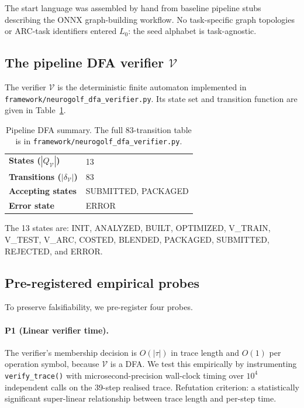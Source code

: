 The start language was assembled by hand from baseline pipeline
stubs describing the ONNX graph-building workflow.  No
task-specific graph topologies or ARC-task identifiers entered
$L_0$: the seed alphabet is task-agnostic.

\subsection{The pipeline DFA verifier $\mathcal{V}$}

The verifier $\mathcal{V}$ is the deterministic finite automaton
implemented in \texttt{framework/neurogolf\_dfa\_verifier.py}.
Its state set and transition function are given in Table~\ref{tab:dfa}.

\begin{table}[ht]
\centering
\caption{Pipeline DFA summary. The full $83$-transition table is
in \texttt{framework/neurogolf\_dfa\_verifier.py}.}
\label{tab:dfa}
\begin{tabular}{l|l}
\hline
\textbf{States ($|Q_\mathcal{V}|$)} & 13 \\
\textbf{Transitions ($|\delta_\mathcal{V}|$)} & 83 \\
\textbf{Accepting states} & \textsf{SUBMITTED}, \textsf{PACKAGED} \\
\textbf{Error state} & \textsf{ERROR} \\
\hline
\end{tabular}
\end{table}

The 13 states are:
\textsf{INIT}, \textsf{ANALYZED}, \textsf{BUILT}, \textsf{OPTIMIZED},
\textsf{V\_TRAIN}, \textsf{V\_TEST}, \textsf{V\_ARC}, \textsf{COSTED},
\textsf{BLENDED}, \textsf{PACKAGED}, \textsf{SUBMITTED},
\textsf{REJECTED}, and \textsf{ERROR}.

\subsection{Pre-registered empirical probes}

To preserve falsifiability, we pre-register four probes.

\paragraph{P1 (Linear verifier time).}
The verifier's membership decision is $O(|\tau|)$ in trace length
and $O(1)$ per operation symbol, because $\mathcal{V}$ is a DFA.
We test this empirically by instrumenting
\texttt{verify\_trace()} with microsecond-precision wall-clock
timing over $10^4$ independent calls on the 39-step realised trace.
Refutation criterion: a statistically significant super-linear
relationship between trace length and per-step time.

